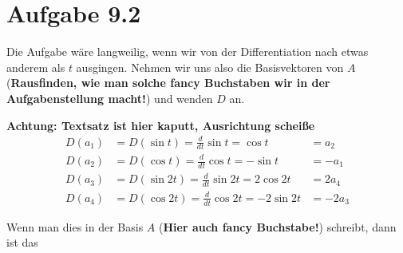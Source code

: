 \documentclass[a4paper,german,12pt,smallheadings]{scrartcl}
\begin{document}
\section*{Aufgabe 9.2}
Die Aufgabe wäre langweilig, wenn wir von der Differentiation nach etwas
anderem als $t$ ausgingen. Nehmen wir uns also die Basisvektoren von $A$
(\textbf{Rausfinden, wie man solche fancy Buchstaben wir in der
Aufgabenstellung macht!}) und wenden $D$ an.

\textbf{Achtung: Textsatz ist hier kaputt, Ausrichtung scheiße}
\begin{align*}
  D(a_1) &= D(\sin t)  = \frac{d}{dt} \sin  t = \cos t    &= a_2 \\
  D(a_2) &= D(\cos t)  = \frac{d}{dt} \cos  t = -\sin t   &= -a_1 \\
  D(a_3) &= D(\sin 2t) = \frac{d}{dt} \sin 2t = 2\cos 2t  &= 2a_4 \\
  D(a_4) &= D(\cos 2t) = \frac{d}{dt} \cos 2t = -2\sin 2t &= -2a_3
\end{align*}

Wenn man dies in der Basis $A$ (\textbf{Hier auch fancy Buchstabe!}) schreibt,
dann ist das
\end{document}
